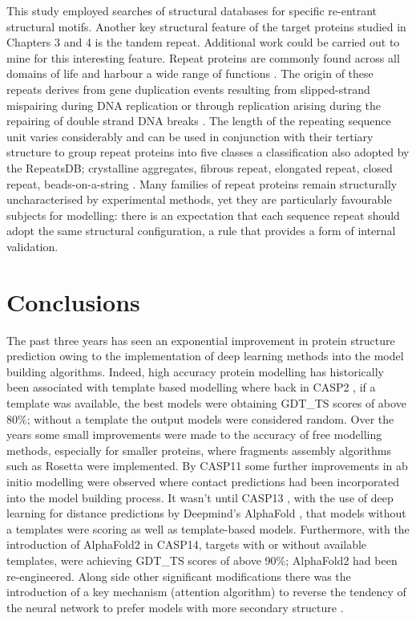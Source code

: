 This study employed searches of structural databases for specific re-entrant structural motifs.  Another key structural feature of the target proteins studied in Chapters 3 and 4 is the tandem repeat.  Additional work could be carried out to mine for this interesting feature. Repeat proteins are commonly found across all domains of life and harbour a wide range of functions \cite{andrade2001protein}. The origin of these repeats derives from gene duplication events \cite{heringa1998detection} resulting from slipped-strand mispairing during DNA replication \cite{paques1998expansions} or through replication arising during the repairing of double strand DNA breaks \cite{paques1998expansions}. The length of the repeating sequence unit varies considerably \cite{heringa1998detection,tompa2003intrinsically} and can be used in conjunction with their tertiary structure to group repeat proteins into five classes \cite{kajava2006beta} a classification also adopted by the RepeatsDB; crystalline aggregates, fibrous repeat, elongated repeat, closed repeat, beads-on-a-string \cite{di2014repeatsdb}.  Many families of repeat proteins remain structurally uncharacterised by experimental methods, yet they are particularly favourable subjects for modelling: there is an expectation that each sequence repeat should adopt the same structural configuration, a rule that provides a form of internal validation.   



\section{Conclusions}
The past three years has seen an exponential improvement in protein structure prediction owing to the implementation of deep learning methods into the model building algorithms.  Indeed, high accuracy protein modelling has historically been associated with template based modelling where back in CASP2 \cite{dixon1997evaluation}, if a template was available, the best models were obtaining GDT\_TS scores of above 80\%; without a template the output models were considered random.  Over the years some small improvements were made to the accuracy of free modelling methods, especially for smaller proteins, where fragments assembly algorithms such as Rosetta \cite{baker2001protein} were implemented.  By CASP11 \cite{monastyrskyy2016new} some further improvements in ab initio modelling were observed where contact predictions had been incorporated into the model building process.  It wasn't until CASP13 \cite{cheng2019estimation}, with the use of deep learning for distance predictions by Deepmind's AlphaFold \cite{senior2019protein}, that models without a templates were scoring as well as template-based models.  Furthermore, with the introduction of AlphaFold2 \cite{Jumper2021} in CASP14, targets with or without available templates, were achieving GDT\_TS scores of above 90\%; AlphaFold2 had been re-engineered.  Along side other significant modifications there was the introduction of a key mechanism (attention algorithm) to reverse the tendency of the neural network to prefer models with more secondary structure \cite{Jumper2021}. 

